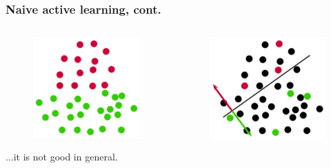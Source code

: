 \documentclass{beamer}
\begin{document}
  \begin{frame}
    \frametitle{Naive active learning, cont.}
    \begin{columns}
      \begin{column}{5cm}
        \begin{figure}
          \includegraphics[scale=.25]{graphics/presentation/al1a} 
        \end{figure}
        ...it is not good in general.\\
      \end{column}
      \begin{column}{5cm}
        \begin{figure}
          \includegraphics[scale=.5]{graphics/presentation/al1b} 
        \end{figure}
      \end{column}
    \end{columns}
  \end{frame}
\end{document}
